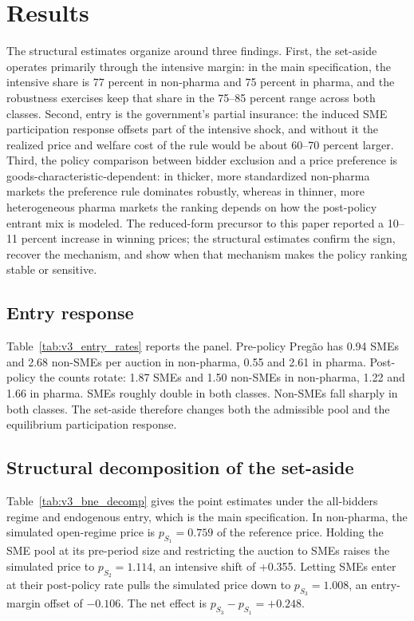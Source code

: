 \section{Results}\label{sec:results}

The structural estimates organize around three findings. First, the set-aside operates primarily through the intensive margin: in the main specification, the intensive share is 77 percent in non-pharma and 75 percent in pharma, and the robustness exercises keep that share in the 75--85 percent range across both classes. Second, entry is the government's partial insurance: the induced SME participation response offsets part of the intensive shock, and without it the realized price and welfare cost of the rule would be about 60--70 percent larger. Third, the policy comparison between bidder exclusion and a price preference is goods-characteristic-dependent: in thicker, more standardized non-pharma markets the preference rule dominates robustly, whereas in thinner, more heterogeneous pharma markets the ranking depends on how the post-policy entrant mix is modeled. The reduced-form precursor to this paper reported a 10--11 percent increase in winning prices; the structural estimates confirm the sign, recover the mechanism, and show when that mechanism makes the policy ranking stable or sensitive.

\subsection{Entry response}

Table~\ref{tab:v3_entry_rates} reports the panel. Pre-policy Preg\~ao has 0.94 SMEs and 2.68 non-SMEs per auction in non-pharma, 0.55 and 2.61 in pharma. Post-policy the counts rotate: 1.87 SMEs and 1.50 non-SMEs in non-pharma, 1.22 and 1.66 in pharma. SMEs roughly double in both classes. Non-SMEs fall sharply in both classes. The set-aside therefore changes both the admissible pool and the equilibrium participation response.

\subsection{Structural decomposition of the set-aside}

Table~\ref{tab:v3_bne_decomp} gives the point estimates under the all-bidders regime and endogenous entry, which is the main specification. In non-pharma, the simulated open-regime price is $p_{S_1} = 0.759$ of the reference price. Holding the SME pool at its pre-period size and restricting the auction to SMEs raises the simulated price to $p_{S_2} = 1.114$, an intensive shift of +0.355. Letting SMEs enter at their post-policy rate pulls the simulated price down to $p_{S_3} = 1.008$, an entry-margin offset of $-0.106$. The net effect is $p_{S_3} - p_{S_1} = +0.248$.

